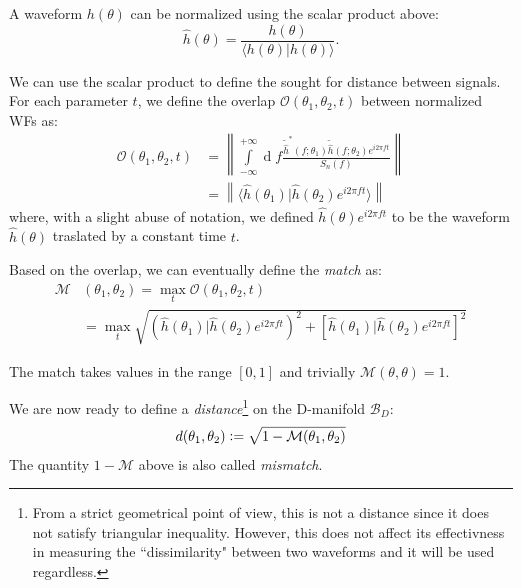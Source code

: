 \documentclass[twocolumn,showpacs,preprintnumbers,nofootinbib,prd,
superscriptaddress,10pt]{revtex4-2}
\renewcommand{\d}[1]{\ensuremath{\operatorname{d}\!{#1}}}
\newcommand{\scalar}[2]{\langle #1|#2 \rangle}
\newcommand{\rescalar}[2]{( #1|#2 )}
\newcommand{\imscalar}[2]{[ #1|#2 ]}
\begin{document}
A waveform $h(\theta)$ can be normalized using the scalar product above:
\begin{equation} \label{eq:normalization}
	\hat{h}(\theta) = \frac{h(\theta)}{\scalar{h(\theta)}{h(\theta)}}.
\end{equation}

We can use the scalar product to define the sought for distance between signals.
For each parameter $t$, we define the overlap $\mathcal{O}(\theta_1,\theta_2, t)$ between normalized WFs as:
\begin{align}\label{eq:overlap}
	\mathcal{O}(\theta_1,\theta_2, t) &= \left\| \int\limits_{-\infty}^{+\infty} \d{f} \frac{\tilde{\hat{h}}^*(f;\theta_1)\tilde{\hat{h}}(f;\theta_2) e^{i2\pi ft}}{S_n(f)} \right\| \nonumber\\
	&= \left\| \scalar{\hat{h}(\theta_1)}{\hat{h}(\theta_2)e^{i 2\pi ft}} \right\| 
\end{align}
where, with a slight abuse of notation, we defined $\hat{h}(\theta)e^{i 2\pi ft}$ to be the waveform $\hat{h}(\theta)$ traslated by a constant time $t$.

Based on the overlap, we can eventually define the {\it match} as:
\begin{align}\label{eq:match}
	\mathcal{M}&(\theta_1,\theta_2) = \max_t \mathcal{O}(\theta_1,\theta_2, t) \\
	&= \max_t \sqrt{ \rescalar{\hat{h}(\theta_1)}{\hat{h}(\theta_2)e^{i 2\pi ft}}^2 + \imscalar{\hat{h}(\theta_1)}{\hat{h}(\theta_2)e^{i2\pi ft}}^2 }  \nonumber 
\end{align}

The match takes values in the range $[0,1]$ and trivially $\mathcal{M}(\theta,\theta) = 1$.

We are now ready to define a {\it distance}\footnote{
From a strict geometrical point of view, this is not a distance since it does not satisfy triangular inequality. However, this does not affect its effectivness in measuring the ``dissimilarity" between two waveforms and it will be used regardless.}
on the D-manifold $\mathcal{B}_D$:
\begin{align}\label{eq:distance}
	d(\theta_1,\theta_2) \vcentcolon= \sqrt{1 - \mathcal{M}(\theta_1,\theta_2)}
\end{align}
The quantity $1-\mathcal{M}$ above is also called {\it mismatch}.
\end{document}
